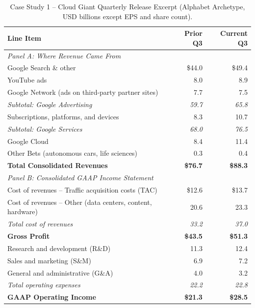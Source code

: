 \begin{table}[htbp]
\centering
\caption{Case Study 1 -- Cloud Giant Quarterly Release Excerpt (Alphabet Archetype, USD billions except EPS and share count).}
\label{tab:ch04-alphabet-archetype}
\small
\begin{tabular}{lrr}
\toprule
\textbf{Line Item} & \textbf{Prior Q3} & \textbf{Current Q3} \\
\midrule
\multicolumn{3}{l}{\emph{Panel A: Where Revenue Came From}} \\
Google Search \& other                          & \$44.0 & \$49.4 \\
YouTube ads                                     & 8.0    & 8.9    \\
Google Network (ads on third-party partner sites) & 7.7  & 7.5    \\
\quad \emph{Subtotal: Google Advertising}       & \emph{59.7} & \emph{65.8} \\
Subscriptions, platforms, and devices           & 8.3    & 10.7   \\
\quad \emph{Subtotal: Google Services}          & \emph{68.0} & \emph{76.5} \\
Google Cloud                                    & 8.4    & 11.4   \\
Other Bets (autonomous cars, life sciences)     & 0.3    & 0.4    \\
\textbf{Total Consolidated Revenues}            & \textbf{\$76.7} & \textbf{\$88.3} \\
\midrule
\multicolumn{3}{l}{\emph{Panel B: Consolidated GAAP Income Statement}} \\
Cost of revenues -- Traffic acquisition costs (TAC) & \$12.6 & \$13.7 \\
Cost of revenues -- Other (data centers, content, hardware) & 20.6 & 23.3 \\
\quad \emph{Total cost of revenues}             & \emph{33.2} & \emph{37.0} \\
\textbf{Gross Profit}                           & \textbf{\$43.5} & \textbf{\$51.3} \\
Research and development (R\&D)                 & 11.3   & 12.4   \\
Sales and marketing (S\&M)                      & 6.9    & 7.2    \\
General and administrative (G\&A)               & 4.0    & 3.2    \\
\quad \emph{Total operating expenses}           & \emph{22.2} & \emph{22.8} \\
\textbf{GAAP Operating Income}                  & \textbf{\$21.3} & \textbf{\$28.5} \\

\end{tabular}
\end{table}
